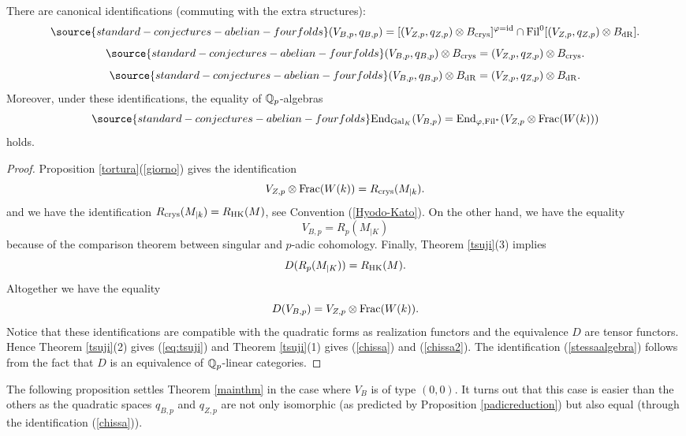 \begin{corollary}
\notready\label{cortsuji}
There are canonical identifications (commuting with the extra structures):
\begin{equation} \label{eq:tsuji}
\source{standard-conjectures-abelian-fourfolds}
 (V_{B,p},q_{B,p}) =[(V_{Z,p},q_{Z,p})\otimes B_\crys]^{\varphi=\id} \cap  \Fil^0[(V_{Z,p},q_{Z,p})\otimes B_\dR].
\end{equation}
\begin{equation}\label{chissa}
\source{standard-conjectures-abelian-fourfolds}
 (V_{B,p},q_{B,p}) \otimes B_\crys=  (V_{Z,p},q_{Z,p}) \otimes B_\crys.
\end{equation}
\begin{equation}\label{chissa2}
\source{standard-conjectures-abelian-fourfolds}
 (V_{B,p},q_{B,p}) \otimes B_\dR=  (V_{Z,p},q_{Z,p}) \otimes B_\dR.
\end{equation}
Moreover, under these identifications,  the  equality of $\mathbb{Q}_p$-algebras
\begin{equation}\label{stessaalgebra}
\source{standard-conjectures-abelian-fourfolds}
 \End_{\Gal_K}(V_{B,p}) = \End_{\varphi,\Fil^*}(V_{Z,p}\otimes \Frac(W(k)))
\end{equation}
holds.
\end{corollary}
\begin{proof}
 Proposition \ref{tortura}(\ref{giorno}) gives the identification
\[  V_{Z,p}\otimes \mathrm{Frac}(W(k)) =  R_{\textnormal{crys}} (M_{\vert k}).\]
and we have the identification $R_{\textnormal{crys}} (M_{\vert k})= R_{\mathrm{HK}} (M)$, see Convention (\ref{Hyodo-Kato}).
On the other hand, we have the equality
\[V_{B,p}  =  R_p (M_{\vert K})\]
because of the comparison theorem between singular and $p$-adic cohomology.
Finally, Theorem \ref{tsuji}(3) implies
\[ D(R_p (M_{\vert K}))   =   R_{\mathrm{HK}} (M).\]
Altogether we have the equality
\[D(V_{B,p}) = V_{Z,p}\otimes \mathrm{Frac}(W(k)).\]
Notice that these identifications are compatible with the quadratic forms as realization functors and the equivalence $D$ are tensor functors.
Hence Theorem \ref{tsuji}(2) gives  (\ref{eq:tsuji}) and Theorem \ref{tsuji}(1) gives  (\ref{chissa}) and   (\ref{chissa2}).
The identification (\ref{stessaalgebra}) follows from the fact that $D$ is an equivalence of $\mathbb{Q}_p$-linear categories.
\end{proof}

The following proposition settles Theorem \ref{mainthm} in the case where $V_B$ is of type $(0,0)$. It turns out that this case is easier than the others as the quadratic spaces $q_{B,p}$ and $q_{Z,p}$ are not only isomorphic (as predicted by Proposition  \ref{padicreduction}) but also equal (through the identification (\ref{chissa})).


